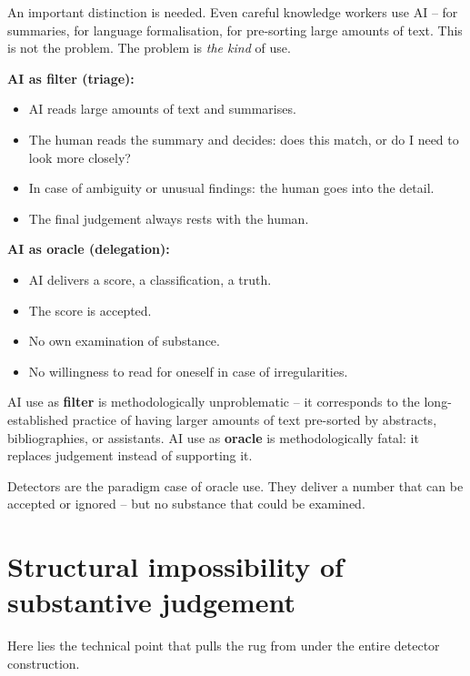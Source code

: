 An important distinction is needed. Even careful knowledge workers
use AI -- for summaries, for language formalisation, for pre-sorting
large amounts of text. This is not the problem. The problem is
\emph{the kind} of use.

\textbf{AI as filter (triage):}
\begin{itemize}[leftmargin=2em,itemsep=2pt,topsep=2pt]
  \item AI reads large amounts of text and summarises.
  \item The human reads the summary and decides: does this match,
        or do I need to look more closely?
  \item In case of ambiguity or unusual findings: the human goes
        into the detail.
  \item The final judgement always rests with the human.
\end{itemize}

\textbf{AI as oracle (delegation):}
\begin{itemize}[leftmargin=2em,itemsep=2pt,topsep=2pt]
  \item AI delivers a score, a classification, a truth.
  \item The score is accepted.
  \item No own examination of substance.
  \item No willingness to read for oneself in case of irregularities.
\end{itemize}

AI use as \textbf{filter} is methodologically unproblematic -- it
corresponds to the long-established practice of having larger
amounts of text pre-sorted by abstracts, bibliographies, or
assistants. AI use as \textbf{oracle} is methodologically fatal:
it replaces judgement instead of supporting it.

Detectors are the paradigm case of oracle use. They deliver a
number that can be accepted or ignored -- but no substance that
could be examined.

\section{Structural impossibility of substantive judgement}

Here lies the technical point that pulls the rug from under the
entire detector construction.


